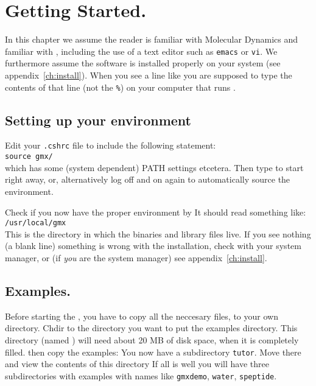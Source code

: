 \chapter{Getting Started.}
\label{ch:start}
In this chapter we assume the reader is familiar with Molecular Dynamics 
and familiar with , including the use of a text editor such as 
{\tt emacs} or {\tt vi}. 
We furthermore assume the {\gromacs} software is
installed properly on your system (see appendix~\ref{ch:install}).
When you see a line like  you are supposed to type
the contents of that line (not the {\tt \%}) on your computer
that runs {\gromacs}.

\section{Setting up your environment}
Edit your {\tt .cshrc} file to include the following statement: \\
{\tt source {\TILDE}gmx/} \\
which has some (system dependent) PATH settings etcetera. Then type
 to start right away, or, alternatively 
log off and on again to automatically source the {\gromacs} environment.

Check if you now have the proper environment by
It should read something like: 
{\tt \\ /usr/local/gmx\\}
This is the directory in which the {\gromacs} binaries and
library files live. If you see nothing (a blank line) something is
wrong with the installation, check with your system manager, or (if
{\em you} are the system manager) see appendix~\ref{ch:install}. 

\section{Examples.}
Before starting the , you have to copy all the neccesary
files, to your own directory. Chdir to the directory you want to put
the examples directory. This directory (named {\tt {}}) 
will need
about 20 MB of disk space, when it is completely filled.
then copy the examples: 
You now have a subdirectory {\tt tutor}. Move there 
and view the contents of this directory
If all is well you will have three subdirectories with examples 
with names like {\tt gmxdemo}, {\tt water}, {\tt speptide}.

